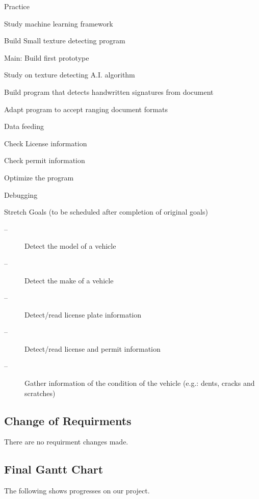 \documentclass[article, onecolumn, draftclsnofoot,10pt, compsoc]{IEEEtran}
\begin{document}
Practice
\begin{description}
	\color{green}
	\item[--]Study machine learning framework
	\color{yellow}
	\item[--]Build Small texture detecting program
\end{description}

\color{black}
Main: Build first prototype
\begin{description}
	\color{Orange}
	\item[--]Study on texture detecting A.I. algorithm
	\color{blue}
	\item[--]Build program that detects handwritten signatures from document
	\color{purple}
	\item[--]Adapt program to accept ranging document formats
	\begin{description}
		\color{black}
		\item[--]Data feeding
		\item[--]Check License information
		\item[--]Check permit information
	\end{description}
	\color{brown}
	\item[--]Optimize the program
	\begin{description}
		\color{black}
		\item[--]Debugging
	\end{description}
\end{description}
Stretch Goals (to be scheduled after completion of original goals)
\begin{description}
	\item[--]Detect the model of a vehicle
	\item[--]Detect the make of a vehicle
	\item[--]Detect/read license plate information
	\item[--]Detect/read license and permit information
	\item[--]Gather information of the condition of the vehicle (e.g.: dents, cracks and scratches)
\end{description}

\subsection{Change of Requirments}
There are no requirment changes made.

\subsection{Final Gantt Chart}
The following shows progresses on our project.
\end{document}
